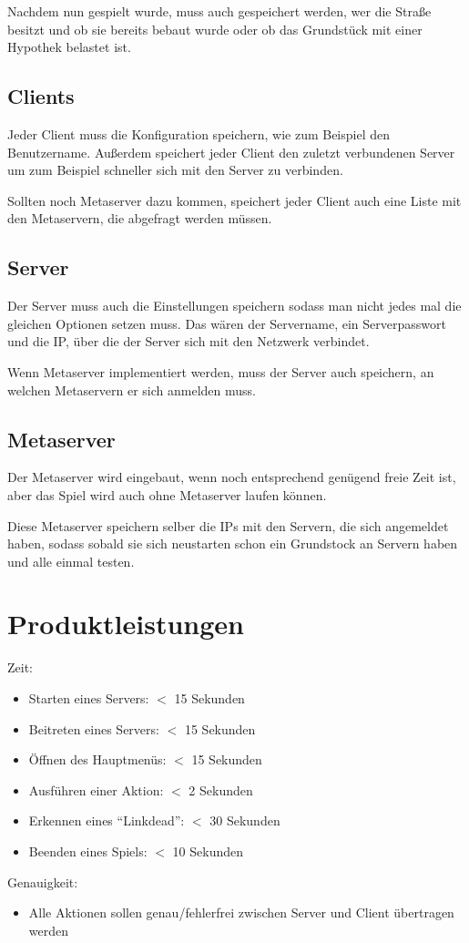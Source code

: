 \documentclass[a4paper,10pt]{article}
\begin{document}
Nachdem nun gespielt wurde, muss auch gespeichert werden, wer die Straße besitzt und ob sie bereits bebaut wurde oder ob das Grundstück mit einer Hypothek belastet ist.
\subsection{Clients}
Jeder Client muss die Konfiguration speichern, wie zum Beispiel den Benutzername. Außerdem speichert jeder Client den zuletzt verbundenen Server um zum Beispiel schneller sich mit den Server zu verbinden.

Sollten noch Metaserver dazu kommen, speichert jeder Client auch eine Liste mit den Metaservern, die abgefragt werden müssen.
\subsection{Server}
Der Server muss auch die Einstellungen speichern sodass man nicht jedes mal die gleichen Optionen setzen muss. Das wären der Servername, ein Serverpasswort und die IP, über die der Server sich mit den Netzwerk verbindet.

Wenn Metaserver implementiert werden, muss der Server auch speichern, an welchen Metaservern er sich anmelden muss.
\subsection{Metaserver}
Der Metaserver wird eingebaut, wenn noch entsprechend genügend freie Zeit ist, aber das Spiel wird auch ohne Metaserver laufen können.

Diese Metaserver speichern selber die IPs mit den Servern, die sich angemeldet haben, sodass sobald sie sich neustarten schon ein Grundstock an Servern haben und alle einmal testen.
\section{Produktleistungen}
Zeit:
\begin{itemize}
\item Starten eines Servers: $<$ 15 Sekunden
\item Beitreten eines Servers: $<$ 15 Sekunden
\item Öffnen des Hauptmenüs: $<$ 15 Sekunden
\item Ausführen einer Aktion: $<$ 2 Sekunden
\item Erkennen eines ``Linkdead'': $<$ 30 Sekunden
\item Beenden eines Spiels: $<$ 10 Sekunden
\end{itemize}
Genauigkeit:
\begin{itemize}
\item Alle Aktionen sollen genau/fehlerfrei zwischen Server und Client übertragen werden
\end{itemize}
\end{document}

